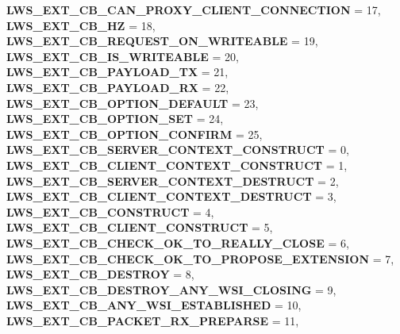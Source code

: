 \begin{DoxyCompactItemize}
{\bfseries L\+W\+S\+\_\+\+E\+X\+T\+\_\+\+C\+B\+\_\+\+C\+A\+N\+\_\+\+P\+R\+O\+X\+Y\+\_\+\+C\+L\+I\+E\+N\+T\+\_\+\+C\+O\+N\+N\+E\+C\+T\+I\+ON} = 17, 
{\bfseries L\+W\+S\+\_\+\+E\+X\+T\+\_\+\+C\+B\+\_\+HZ} = 18, 
{\bfseries L\+W\+S\+\_\+\+E\+X\+T\+\_\+\+C\+B\+\_\+\+R\+E\+Q\+U\+E\+S\+T\+\_\+\+O\+N\+\_\+\+W\+R\+I\+T\+E\+A\+B\+LE} = 19, 
\newline
{\bfseries L\+W\+S\+\_\+\+E\+X\+T\+\_\+\+C\+B\+\_\+\+I\+S\+\_\+\+W\+R\+I\+T\+E\+A\+B\+LE} = 20, 
{\bfseries L\+W\+S\+\_\+\+E\+X\+T\+\_\+\+C\+B\+\_\+\+P\+A\+Y\+L\+O\+A\+D\+\_\+\+TX} = 21, 
{\bfseries L\+W\+S\+\_\+\+E\+X\+T\+\_\+\+C\+B\+\_\+\+P\+A\+Y\+L\+O\+A\+D\+\_\+\+RX} = 22, 
{\bfseries L\+W\+S\+\_\+\+E\+X\+T\+\_\+\+C\+B\+\_\+\+O\+P\+T\+I\+O\+N\+\_\+\+D\+E\+F\+A\+U\+LT} = 23, 
\newline
{\bfseries L\+W\+S\+\_\+\+E\+X\+T\+\_\+\+C\+B\+\_\+\+O\+P\+T\+I\+O\+N\+\_\+\+S\+ET} = 24, 
{\bfseries L\+W\+S\+\_\+\+E\+X\+T\+\_\+\+C\+B\+\_\+\+O\+P\+T\+I\+O\+N\+\_\+\+C\+O\+N\+F\+I\+RM} = 25, 
{\bfseries L\+W\+S\+\_\+\+E\+X\+T\+\_\+\+C\+B\+\_\+\+S\+E\+R\+V\+E\+R\+\_\+\+C\+O\+N\+T\+E\+X\+T\+\_\+\+C\+O\+N\+S\+T\+R\+U\+CT} = 0, 
{\bfseries L\+W\+S\+\_\+\+E\+X\+T\+\_\+\+C\+B\+\_\+\+C\+L\+I\+E\+N\+T\+\_\+\+C\+O\+N\+T\+E\+X\+T\+\_\+\+C\+O\+N\+S\+T\+R\+U\+CT} = 1, 
\newline
{\bfseries L\+W\+S\+\_\+\+E\+X\+T\+\_\+\+C\+B\+\_\+\+S\+E\+R\+V\+E\+R\+\_\+\+C\+O\+N\+T\+E\+X\+T\+\_\+\+D\+E\+S\+T\+R\+U\+CT} = 2, 
{\bfseries L\+W\+S\+\_\+\+E\+X\+T\+\_\+\+C\+B\+\_\+\+C\+L\+I\+E\+N\+T\+\_\+\+C\+O\+N\+T\+E\+X\+T\+\_\+\+D\+E\+S\+T\+R\+U\+CT} = 3, 
{\bfseries L\+W\+S\+\_\+\+E\+X\+T\+\_\+\+C\+B\+\_\+\+C\+O\+N\+S\+T\+R\+U\+CT} = 4, 
{\bfseries L\+W\+S\+\_\+\+E\+X\+T\+\_\+\+C\+B\+\_\+\+C\+L\+I\+E\+N\+T\+\_\+\+C\+O\+N\+S\+T\+R\+U\+CT} = 5, 
\newline
{\bfseries L\+W\+S\+\_\+\+E\+X\+T\+\_\+\+C\+B\+\_\+\+C\+H\+E\+C\+K\+\_\+\+O\+K\+\_\+\+T\+O\+\_\+\+R\+E\+A\+L\+L\+Y\+\_\+\+C\+L\+O\+SE} = 6, 
{\bfseries L\+W\+S\+\_\+\+E\+X\+T\+\_\+\+C\+B\+\_\+\+C\+H\+E\+C\+K\+\_\+\+O\+K\+\_\+\+T\+O\+\_\+\+P\+R\+O\+P\+O\+S\+E\+\_\+\+E\+X\+T\+E\+N\+S\+I\+ON} = 7, 
{\bfseries L\+W\+S\+\_\+\+E\+X\+T\+\_\+\+C\+B\+\_\+\+D\+E\+S\+T\+R\+OY} = 8, 
{\bfseries L\+W\+S\+\_\+\+E\+X\+T\+\_\+\+C\+B\+\_\+\+D\+E\+S\+T\+R\+O\+Y\+\_\+\+A\+N\+Y\+\_\+\+W\+S\+I\+\_\+\+C\+L\+O\+S\+I\+NG} = 9, 
\newline
{\bfseries L\+W\+S\+\_\+\+E\+X\+T\+\_\+\+C\+B\+\_\+\+A\+N\+Y\+\_\+\+W\+S\+I\+\_\+\+E\+S\+T\+A\+B\+L\+I\+S\+H\+ED} = 10, 
{\bfseries L\+W\+S\+\_\+\+E\+X\+T\+\_\+\+C\+B\+\_\+\+P\+A\+C\+K\+E\+T\+\_\+\+R\+X\+\_\+\+P\+R\+E\+P\+A\+R\+SE} = 11, 

\end{DoxyCompactItemize}
